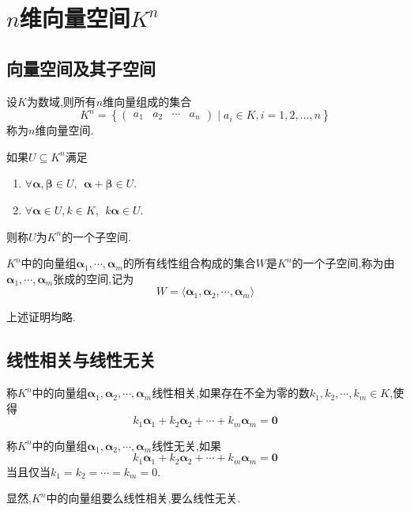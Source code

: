 \documentclass{ctexart}
\begin{document}
\section{$n$维向量空间$K^n$}
\subsection{向量空间及其子空间}
\begin{definition}[$n$维向量空间]
    设$K$为数域,则所有$n$维向量组成的集合
    \[K^n=\left\{\begin{pmatrix}
        a_1&a_2&\cdots&a_n
    \end{pmatrix}\mid a_i\in K, i=1,2,\ldots,n\right\}\]
    称为$n$维向量空间.
\end{definition}
\begin{definition}[子空间]
    如果$U\subseteq K^n$满足
    \begin{enumerate}[label=\tbf{\arabic*}.,topsep=0pt,parsep=0pt,itemsep=0pt,partopsep=0pt]
        \item $\forall\boldsymbol{\alpha},\boldsymbol{\beta}\in U,\ \ \boldsymbol{\alpha}+\boldsymbol{\beta}\in U$.
        \item $\forall\boldsymbol{\alpha}\in U,k\in K,\ \ k\boldsymbol{\alpha}\in U$.
    \end{enumerate}
    则称$U$为$K^n$的一个子空间.
\end{definition}
\begin{definition}[张成空间]
    $K^n$中的向量组$\boldsymbol{\alpha}_1,\cdots,\boldsymbol{\alpha}_m$的所有线性组合构成的集合$W$是$K^n$的一个子空间,称为由$\boldsymbol{\alpha}_1,\cdots,\boldsymbol{\alpha}_m$张成的空间,记为
    \[W=\langle\boldsymbol{\alpha}_1,\boldsymbol{\alpha}_2,\cdots,\boldsymbol{\alpha}_m\rangle\]
\end{definition}
上述证明均略.
\subsection{线性相关与线性无关}
\begin{definition}[线性相关]
    称$K^n$中的向量组$\boldsymbol{\alpha}_1,\boldsymbol{\alpha}_2,\cdots,\boldsymbol{\alpha}_m$线性相关,如果存在不全为零的数$k_1,k_2,\cdots,k_m\in K$,使得
    \[k_1\boldsymbol{\alpha}_1+k_2\boldsymbol{\alpha}_2+\cdots+k_m\boldsymbol{\alpha}_m=\boldsymbol{0}\]
\end{definition}
\begin{definition}[线性无关]
    称$K^n$中的向量组$\boldsymbol{\alpha}_1,\boldsymbol{\alpha}_2,\cdots,\boldsymbol{\alpha}_m$线性无关,如果
    \[k_1\boldsymbol{\alpha}_1+k_2\boldsymbol{\alpha}_2+\cdots+k_m\boldsymbol{\alpha}_m=\boldsymbol{0}\]
    当且仅当$k_1=k_2=\cdots=k_m=0$.
\end{definition}
显然,$K^n$中的向量组要么线性相关,要么线性无关.
\end{document}
